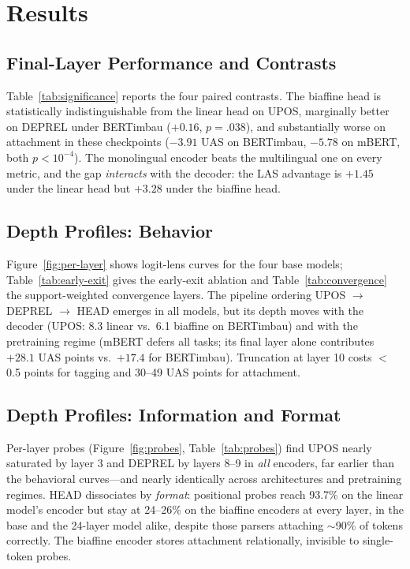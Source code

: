 \documentclass[letterpaper]{article}
\begin{document}
\section{Results}

\subsection{Final-Layer Performance and Contrasts}
Table~\ref{tab:significance} reports the four paired contrasts. The biaffine
head is statistically indistinguishable from the linear head on UPOS,
marginally better on DEPREL under BERTimbau ($+0.16$, $p{=}.038$), and
substantially worse on attachment in these checkpoints ($-3.91$ UAS on
BERTimbau, $-5.78$ on mBERT, both $p<10^{-4}$). The monolingual encoder beats
the multilingual one on every metric, and the gap \emph{interacts} with the
decoder: the LAS advantage is $+1.45$ under the linear head but $+3.28$ under
the biaffine head.

\subsection{Depth Profiles: Behavior}
Figure~\ref{fig:per-layer} shows logit-lens curves for the four base models;
Table~\ref{tab:early-exit} gives the early-exit ablation and
Table~\ref{tab:convergence} the support-weighted convergence layers. The
pipeline ordering UPOS $\rightarrow$ DEPREL $\rightarrow$ HEAD emerges in all
models, but its depth moves with the decoder (UPOS: 8.3 linear vs.\ 6.1
biaffine on BERTimbau) and with the pretraining regime (mBERT defers all
tasks; its final layer alone contributes $+28.1$ UAS points vs.\ $+17.4$ for
BERTimbau). Truncation at layer 10 costs $<$0.5 points for tagging and 30--49
UAS points for attachment.

\subsection{Depth Profiles: Information and Format}
Per-layer probes (Figure~\ref{fig:probes}, Table~\ref{tab:probes}) find UPOS
nearly saturated by layer 3 and DEPREL by layers 8--9 in \emph{all} encoders,
far earlier than the behavioral curves---and nearly identically across
architectures and pretraining regimes. HEAD dissociates by \emph{format}:
positional probes reach 93.7\% on the linear model's encoder but stay at
24--26\% on the biaffine encoders at every layer, in the base and the
24-layer model alike, despite those parsers attaching $\sim$90\% of tokens
correctly. The biaffine encoder stores attachment relationally, invisible to
single-token probes.
\end{document}
